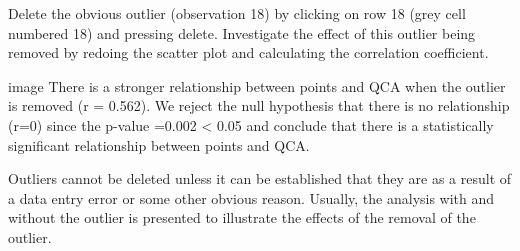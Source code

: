  
Delete the obvious outlier (observation 18) by clicking on row 18 (grey cell numbered 18) and pressing delete. Investigate the effect of this outlier being removed by redoing the scatter plot and calculating the correlation coefficient.
 
image
There is a stronger relationship between points and QCA when the outlier is removed (r = 0.562). We reject the null hypothesis that there is no relationship (r=0) since the p-value =0.002 < 0.05 and conclude that there is a statistically significant relationship between points and QCA.
 
Outliers cannot be deleted unless it can be established that they are as a result of a data entry error or some other obvious reason. Usually, the analysis with and without the outlier is presented to illustrate the effects of the removal of the outlier.
 
 
 
 
